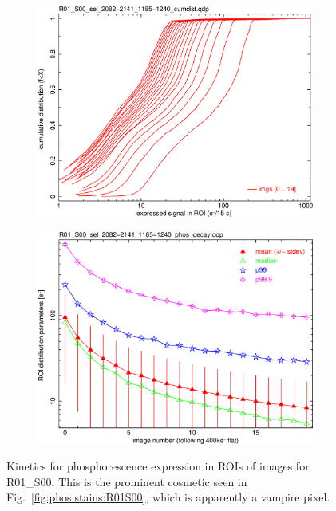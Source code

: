 \begin{figure}[!htbp]
\begin{subfigure}{0.45\textwidth}
  \includegraphics[width=\textwidth]{figures/phosphorescence-survey/phos_kinetics/R01_S00_sel_2082-2141_1185-1240_cumdist.png}    
\end{subfigure}
\hfil
\begin{subfigure}{0.45\textwidth}
  \centering
  \includegraphics[width=\textwidth]{figures/phosphorescence-survey/phos_kinetics/R01_S00_sel_2082-2141_1185-1240_phos_decay.png}
\end{subfigure}
\newline
\caption{Kinetics for phosphorescence expression in ROIs of images for R01\_S00. This is the prominent cosmetic seen in Fig.~\ref{fig:phos:stains:R01S00}, which is apparently a  vampire pixel.}
\label{fig:phos:kinetics:R01S00}
\end{figure}

